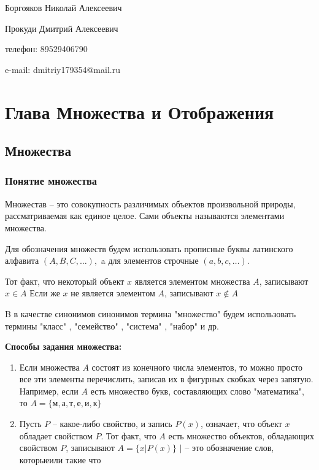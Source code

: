\documentclass[12pt, a4paper]{article}
\begin{document}
    Боргояков Николай Алексеевич
    
    Прокуди Дмитрий Алексеевич

    телефон: 89529406790

    e-mail: dmitriy179354@mail.ru

    \section{Глава Множества и Отображения}
    \subsection{Множества}
    \subsubsection{Понятие множества}

    Множестав -- это совокупность различимых объектов произвольной природы,
    рассматриваемая как единое целое. Сами объекты называются элементами множества.

    Для обозначения множеств будем использовать прописные буквы латинского алфавита $(A, B, C,\ldots),$
    a для элементов строчные $(a, b, c, \ldots)$.

    Тот факт, что некоторый объект $x$ является элементом множества $A$, записывают 
    $x \in A $ Если же $x$ не является элементом $A$, записывают $x \notin A$

    B в качестве синонимов синонимов термина "множество" будем использовать термины 
    "класс" , "семейство" , "система" , "набор" и др.


    \textbf{Способы задания множества:}
    \begin{enumerate}
        \item Если множества $A$ состоят из конечного числа элементов,
        то можно просто все эти элементы перечислить, записав их в фигурных 
        скобках через запятую.
        Например, если $A$ есть множество букв, составляющих слово "математика", то
        $A = \{\text{м}, \text{а}, \text{т}, \text{е}, \text{и}, \text{к}\}$
        
        \item Пусть $P$ -- какое-либо свойство, и запись $P(x)$, означает, что объект
        $x$ обладает свойством $P$. Тот факт, что $A$ есть множество объектов,
        обладающих свойством $P$, записывают $A = \{x | P(x)\}$
        $|$ -- это обозначение слов, \glqq которые\grqq  или  \glqq такие что\grqq 
    \end{enumerate}
\end{document}
